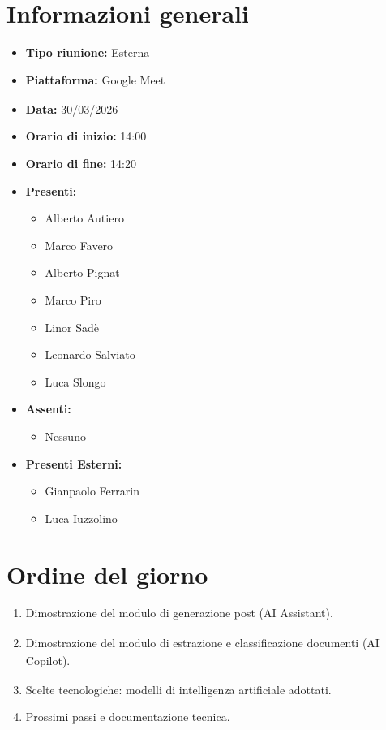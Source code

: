 \documentclass[a4paper,12pt]{article}
\newcommand{\G}{\textsubscript{\scalebox{0.6}{\textbf{G}}}\xspace}
\begin{document}
\newpage
\tableofcontents
\newpage

\section{Informazioni generali}

\begin{itemize}
    \item \textbf{Tipo riunione:} Esterna
    \item \textbf{Piattaforma:} Google Meet\G
    \item \textbf{Data:} 30/03/2026
    \item \textbf{Orario di inizio:} 14:00
    \item \textbf{Orario di fine:} 14:20
    \item \textbf{Presenti:}
    \begin{itemize}[leftmargin=1.5em, itemsep=3pt, label={\rule[0.5ex]{0.4em}{0.4em}}]
        \item Alberto Autiero
        \item Marco Favero
        \item Alberto Pignat
        \item Marco Piro
        \item Linor Sadè
        \item Leonardo Salviato
        \item Luca Slongo
    \end{itemize}
    \item \textbf{Assenti:}
    \begin{itemize}[leftmargin=1.5em, itemsep=3pt, label={\rule[0.5ex]{0.4em}{0.4em}}]
        \item Nessuno
    \end{itemize}
    \item \textbf{Presenti Esterni:}
    \begin{itemize}[leftmargin=1.5em, itemsep=3pt, label={\rule[0.5ex]{0.4em}{0.4em}}]
      \item Gianpaolo Ferrarin
      \item Luca Iuzzolino
    \end{itemize}
\end{itemize}

\section{Ordine del giorno}

\begin{enumerate}
    \item \label{itm:gen} Dimostrazione del modulo\G di generazione post (AI\G Assistant).
    \item \label{itm:ext} Dimostrazione del modulo\G di estrazione e classificazione documenti (AI Copilot\G).
    \item \label{itm:tech} Scelte tecnologiche: modelli di intelligenza artificiale adottati.
    \item \label{itm:next} Prossimi passi e documentazione tecnica.
\end{enumerate}
\end{document}
